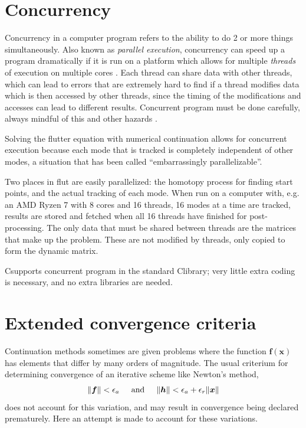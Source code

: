 \documentclass[10pt,openany,twoside]{book}
\numberwithin{equation}{section}   %
\newcommand{\Cmd}[1]{{\sf #1}}
\newcommand{\Newterm}[1]{{\em #1}}
\newcommand{\Vector}[1]{\boldsymbol{#1}}
\def\Cpp{{C\nolinebreak[4]\hspace{-.05em}\raisebox{.4ex}{\tiny\bf ++}}\:}
\begin{document}
\newpage
\section{Concurrency}\label{sect:concurrency}
Concurrency in a computer program refers to the ability to do 2 or
more things simultaneously. Also known as \Newterm{parallel execution},
concurrency can speed up a program dramatically if it is run on a platform
which allows for multiple \Newterm{threads} of execution on multiple cores
\cite{williams2009c++}.
Each thread can share data with other threads, which can lead to errors that
are extremely hard to find if a thread modifies data which is then accessed by
other threads, since the timing of the modifications and accesses can lead
to different results. Concurrent program must be done carefully, always mindful
of this and other hazards
\cite{williams2009c++}.
\par
Solving the flutter equation with numerical continuation allows for
concurrent execution because each mode that is tracked is completely
independent of other modes, a situation that has been called
``embarrassingly parallelizable''.
\par
Two places in \Cmd{flut} are easily parallelized:
the homotopy process for
finding start points, and the actual tracking of each mode. When run on a
computer with, e.g. an AMD Ryzen 7 with 8 cores and 16 threads, 16 modes
at a time are tracked, results are stored and fetched when all 16 threads have
finished for post-processing.
The only data that must be shared between threads are the matrices that
make up the problem. These are not modified by threads, only copied to form
the dynamic matrix.
\par
\Cpp supports concurrent program in the standard \Cpp library; very little extra
coding is necessary, and no extra libraries are needed.

\section{Extended convergence criteria}\label{sect:ecc}
Continuation methods sometimes are given problems where the function
$\Vector{f(x)}$
has elements that differ by many orders of magnitude. The usual criterium
for determining convergence of an iterative scheme like Newton's method,
\begin{equation}
\label{eqn:tradcc}
\| \Vector{f} \| < \epsilon_{a} \hspace{0.2in} \text{and} \hspace{0.2in} \| \Vector{h} \| < \epsilon_{a} + \epsilon_{r}\| \Vector{x} \|
\end{equation}
does not account for this variation, and may result in convergence being
declared prematurely. Here an attempt is made to account for these variations.
\end{document}
